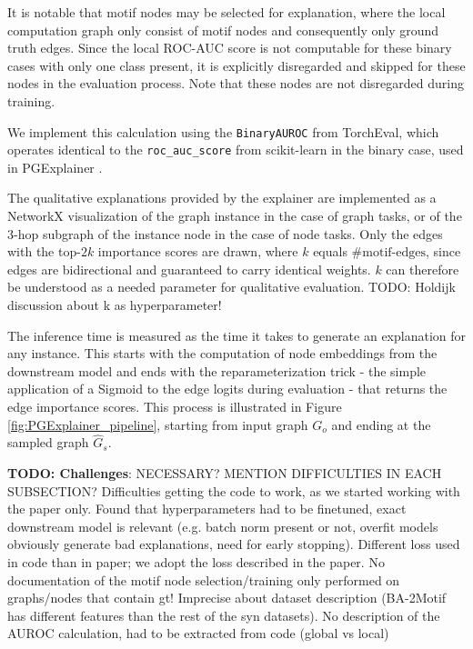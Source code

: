It is notable that motif nodes may be selected for explanation, where the local computation graph only consist of motif nodes and consequently only ground truth edges. Since the local ROC-AUC score is not computable for these binary cases with only one class present, it is explicitly disregarded and skipped for these nodes in the evaluation process. Note that these nodes are not disregarded during training.

We implement this calculation using the \lstinline|BinaryAUROC| from TorchEval, which operates identical to the \lstinline|roc_auc_score| from scikit-learn \cite{pedregosa2011scikit} in the binary case, used in PGExplainer \cite{luo2020parameterized}.

The qualitative explanations provided by the explainer are implemented as a NetworkX visualization of the graph instance in the case of graph tasks, or of the $3$-hop subgraph of the instance node in the case of node tasks. Only the edges with the top-$2k$ importance scores are drawn, where $k$ equals $\text{\#motif-edges}$, since edges are bidirectional and guaranteed to carry identical weights. $k$ can therefore be understood as a needed parameter for qualitative evaluation. TODO: Holdijk discussion about k as hyperparameter! \bigskip

The inference time is measured as the time it takes to generate an explanation for any instance. This starts with the computation of node embeddings from the downstream model and ends with the reparameterization trick - the simple application of a Sigmoid to the edge logits during evaluation - that returns the edge importance scores. This process is illustrated in Figure \ref{fig:PGExplainer_pipeline}, starting from input graph $G_o$ and ending at the sampled graph $\hat{G}_s$. \bigskip

\textbf{TODO: Challenges}: NECESSARY? MENTION DIFFICULTIES IN EACH SUBSECTION? Difficulties getting the code to work, as we started working with the paper only. Found that hyperparameters had to be finetuned, exact downstream model is relevant (e.g. batch norm present or not, overfit models obviously generate bad explanations, need for early stopping). Different loss used in code than in paper; we adopt the loss described in the paper. No documentation of the motif node selection/training only performed on graphs/nodes that contain gt! Imprecise about dataset description (BA-2Motif has different features than the rest of the syn datasets). No description of the AUROC calculation, had to be extracted from code (global vs local) \bigskip

